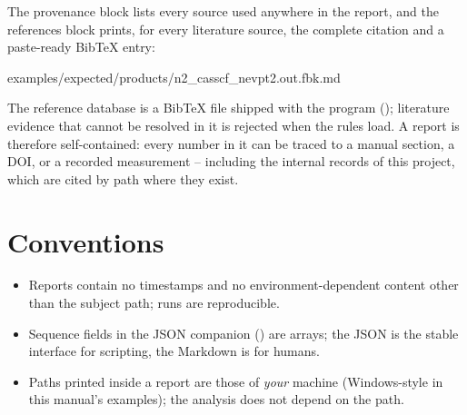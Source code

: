 The provenance block lists every source used anywhere in the report, and the
references block prints, for every literature source, the complete citation and
a paste-ready BibTeX entry:


  {examples/expected/products/n2_casscf_nevpt2.out.fbk.md}

The reference database is a BibTeX file shipped with the program
(); literature evidence that cannot be resolved in it is
rejected when the rules load. A report is therefore self-contained: every number
in it can be traced to a manual section, a DOI, or a recorded measurement --
including the internal records of this project, which are cited by path where
they exist.

\section{Conventions}

\begin{itemize}
  \item Reports contain no timestamps and no environment-dependent content other
    than the subject path; runs are reproducible.
  \item Sequence fields in the JSON companion () are arrays;
    the JSON is the stable interface for scripting, the Markdown is for humans.
  \item Paths printed inside a report are those of \emph{your} machine
    (Windows-style in this manual's examples); the analysis does not depend on
    the path.
\end{itemize}
